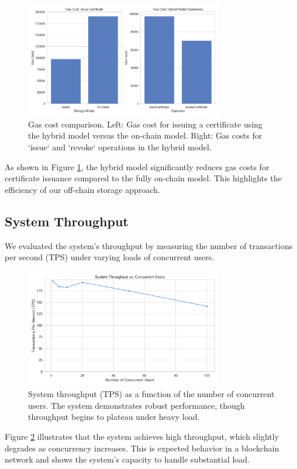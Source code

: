 \documentclass[lettersize,journal]{IEEEtran}
\begin{document}
\begin{itemize}
\begin{figure}[!h]
\centering
\includegraphics[width=3.4in]{figures/gas_cost_comparison.png}
\caption{Gas cost comparison. Left: Gas cost for issuing a certificate using the hybrid model versus the on-chain model. Right: Gas costs for `issue` and `revoke` operations in the hybrid model.}
\label{fig:gas_cost}
\end{figure}

As shown in Figure \ref{fig:gas_cost}, the hybrid model significantly reduces gas costs for certificate issuance compared to the fully on-chain model. This highlights the efficiency of our off-chain storage approach.

\subsection{System Throughput}
We evaluated the system's throughput by measuring the number of transactions per second (TPS) under varying loads of concurrent users.

\begin{figure}[!h]
\centering
\includegraphics[width=3.4in]{figures/throughput_curve.png}
\caption{System throughput (TPS) as a function of the number of concurrent users. The system demonstrates robust performance, though throughput begins to plateau under heavy load.}
\label{fig:throughput}
\end{figure}

Figure \ref{fig:throughput} illustrates that the system achieves high throughput, which slightly degrades as concurrency increases. This is expected behavior in a blockchain network and shows the system's capacity to handle substantial load.


\end{itemize}
\end{document}
